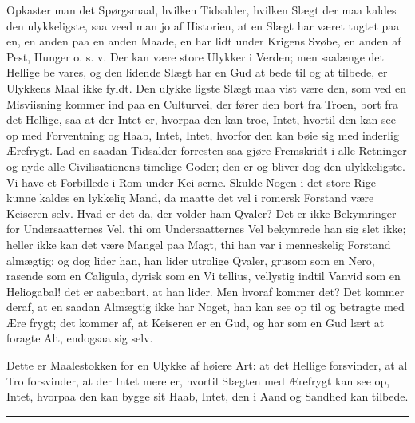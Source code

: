 \documentclass[12pt]{book}
\newcommand{\opage}[1]{\marginnote{\footnotesize\textit{[#1]}}}
\begin{document}
Opkaster man det Spørgsmaal, hvilken Tidsalder,
hvilken Slægt der maa kaldes den ulykkeligste, saa veed
man jo af Historien, at en Slægt har været tugtet paa en,
en anden paa en anden Maade, en har lidt under Krigens
Svøbe, en anden af Pest, Hunger o. s. v. Der kan være
store Ulykker i Verden; men saalænge det Hellige be\-%
vares, og den lidende Slægt har en Gud at bede til og
at tilbede, er Ulykkens Maal ikke fyldt. Den ulykke\-%
ligste Slægt maa vist være den, som ved en Misviisning
kommer ind paa en Culturvei, der fører den bort fra Troen,
bort fra det Hellige, saa at der Intet er, hvorpaa den
kan troe, Intet, hvortil den kan see op med Forventning
og Haab, Intet, Intet, hvorfor den kan bøie sig med
inderlig Ærefrygt. Lad en saadan Tidsalder forresten
saa gjøre Fremskridt i alle Retninger og nyde alle
Civilisationens timelige Goder; den er og bliver dog den
ulykkeligste. Vi have et Forbillede i Rom under Kei\-%
\opage{118}\setcounter{footnote}{0}%
serne. Skulde Nogen i det store Rige kunne kaldes en
lykkelig Mand, da maatte det vel i romersk Forstand
være Keiseren selv. Hvad er det da, der volder ham
Qvaler? Det er ikke Bekymringer for Undersaatternes
Vel, thi om Undersaatternes Vel bekymrede han sig slet
ikke; heller ikke kan det være Mangel paa Magt, thi
han var i menneskelig Forstand almægtig; og dog
lider han, han lider utrolige Qvaler, grusom som en
Nero, rasende som en Caligula, dyrisk som en Vi\-%
tellius, vellystig indtil Vanvid som en Heliogabal!
det er aabenbart, at han lider. Men hvoraf kommer
det? Det kommer deraf, at en saadan Almægtig ikke
har Noget, han kan see op til og betragte med Ære\-%
frygt; det kommer af, at Keiseren er en Gud, og har
som en Gud lært at foragte Alt, endogsaa sig selv.

Dette er Maalestokken for en Ulykke af høiere Art:
at det Hellige forsvinder, at al Tro forsvinder, at der
Intet mere er, hvortil Slægten med Ærefrygt kan see op,
Intet, hvorpaa den kan bygge sit Haab, Intet, den i Aand
og Sandhed kan tilbede.

\begin{center}\rule{3cm}{0.4pt}\end{center}
\end{document}
